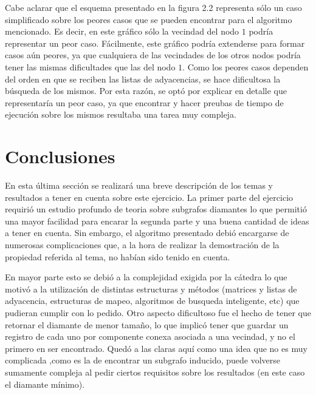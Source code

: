 \documentclass[a4paper,11pt] {article}
\begin{document}
Cabe aclarar que el esquema presentado en la figura 2.2 representa s\'olo un caso simplificado sobre los peores casos que se pueden encontrar para el algoritmo mencionado. Es decir, en este gr\'afico s\'olo la vecindad del nodo $1$ podr\'ia representar un peor caso. F\'acilmente, este gr\'afico podr\'ia extenderse para formar casos a\'un peores, ya que cualquiera de las vecindades de los otros nodos podr\'ia tener las mismas dificultades que las del nodo $1$. Como los peores casos dependen del orden en que se reciben las listas de adyacencias, se hace dificultosa la b\'usqueda de los mismos. Por esta raz\'on, se opt\'o por explicar en detalle que representar\'ia un peor caso, ya que encontrar y hacer preubas de tiempo de ejecuci\'on sobre los mismos resultaba una tarea muy compleja.

\section*{Conclusiones}

En esta \'ultima secci\'on se realizar\'a una breve descripci\'on de los temas y resultados a tener en cuenta sobre este ejercicio. La primer parte del ejercicio requiri\'o un estudio profundo de teoria sobre subgrafos diamantes lo que permiti\'o una mayor facilidad para encarar la segunda parte y una buena cantidad de ideas a tener en cuenta. Sin embargo, el algoritmo presentado debi\'o encargarse de numerosas complicaciones que, a la hora de realizar la demostraci\'on de la propiedad referida al tema, no hab\'ian sido tenido en cuenta.

En mayor parte esto se debi\'o a la complejidad exigida por la c\'atedra lo que motiv\'o a la utilizaci\'on de distintas estructuras y m\'etodos (matrices y listas de adyacencia, estructuras de mapeo, algoritmos de busqueda inteligente, etc) que pudieran cumplir con lo pedido. Otro aspecto dificultoso fue el hecho de tener que retornar el diamante de menor tama\~{n}o, lo que implic\'o tener que guardar un registro de cada uno por componente conexa asociada a una vecindad, y no el primero en ser encontrado. Qued\'o a las claras aqu\'i como una idea que no es muy complicada ,como es la de encontrar un subgrafo inducido, puede volverse sumamente compleja al pedir ciertos requisitos sobre los resultados (en este caso el diamante m\'inimo).
\end{document}
